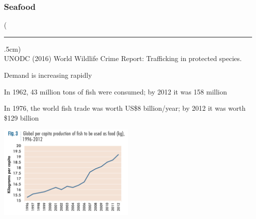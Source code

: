 \documentclass[10pt]{beamer}
\newenvironment{reference}[2]{%
	\begin{textblock*}{\textwidth}(#1,#2)
		\tiny\bgroup\color{gray}}{\egroup\end{textblock*}}
\begin{document}
\begin{frame}[t]
\frametitle{Seafood}
\vspace{0.5cm}

	\begin{reference}{4mm}{92mm}
		\rule{1.5cm}{0.25pt}\\
		UNODC (2016) World Wildlife Crime Report: Trafficking in protected species.
	\end{reference}

	Demand is increasing rapidly\\
	
	\vspace{0.5cm}
	
	In 1962, 43 million tons of fish were consumed; by 2012 it was 158 million\\
	
	\vspace{0.5cm}
	
	In 1976, the world fish trade was worth US\$8 billion/year; by 2012 it was worth \$129 billion
	
	\vspace{0.25cm}
	
	\begin{center}
		\includegraphics[width=0.5\textwidth]{figures/fish_demand.png}
	\end{center}
\end{frame}
\end{document}
